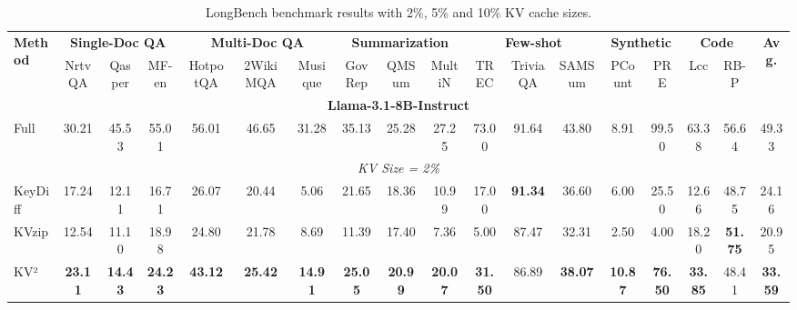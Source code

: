 \documentclass[11pt]{article}
\begin{document}
\pagestyle{empty}

\begin{table}[htbp]
\centering
\caption{LongBench benchmark results with 2\%, 5\% and 10\% KV cache sizes.}
\label{tab:longbench_results}
\small
\setlength{\tabcolsep}{3pt}
\renewcommand{\arraystretch}{1.2}

\begin{tabular}{l|ccc|ccc|ccc|ccc|cc|cc|c}
\toprule
\multirow{2}{*}{\textbf{Method}} 
    & \multicolumn{3}{c|}{\textbf{Single-Doc QA}}
    & \multicolumn{3}{c|}{\textbf{Multi-Doc QA}} 
    & \multicolumn{3}{c|}{\textbf{Summarization}}
    & \multicolumn{3}{c|}{\textbf{Few-shot}}
    & \multicolumn{2}{c|}{\textbf{Synthetic}}
    & \multicolumn{2}{c|}{\textbf{Code}}
    & \multirow{2}{*}{\textbf{Avg.}} \\
\cmidrule(lr){2-4} \cmidrule(lr){5-7} \cmidrule(lr){8-10} \cmidrule(lr){11-13} \cmidrule(lr){14-15} \cmidrule(lr){16-17}
    & NrtvQA & Qasper & MF-en 
    & HotpotQA & 2WikiMQA & Musique 
    & GovRep & QMSum & MultiN
    & TREC & TriviaQA & SAMSum
    & PCount & PRE
    & Lcc & RB-P
    & \\
\midrule

\multicolumn{18}{c}{\textbf{Llama-3.1-8B-Instruct}} \\
\midrule

Full 
    & 30.21 & 45.53 & 55.01
    & 56.01 & 46.65 & 31.28
    & 35.13 & 25.28 & 27.25
    & 73.00 & 91.64 & 43.80
    & 8.91 & 99.50
    & 63.38 & 56.64
    & 49.33 \\

\midrule
\multicolumn{18}{c}{\textit{KV Size = 2\%}} \\
\midrule

KeyDiff 
    & 17.24 & 12.11 & 16.71
    & 26.07 & 20.44 & 5.06
    & 21.65 & 18.36 & 10.99
    & 17.00 & \textbf{91.34} & 36.60
    & 6.00 & 25.50
    & 12.66 & 48.75
    & 24.16 \\

KVzip 
    & 12.54 & 11.10 & 18.98
    & 24.80 & 21.78 & 8.69
    & 11.39 & 17.40 & 7.36
    & 5.00 & 87.47 & 32.31
    & 2.50 & 4.00
    & 18.20 & \textbf{51.75}
    & 20.95 \\

KV²
    & \textbf{23.11} & \textbf{14.43} & \textbf{24.23}
    & \textbf{43.12} & \textbf{25.42} & \textbf{14.91}
    & \textbf{25.05} & \textbf{20.99} & \textbf{20.07}
    & \textbf{31.50} & 86.89 & \textbf{38.07}
    & \textbf{10.87} & \textbf{76.50}
    & \textbf{33.85} & 48.41
    & \textbf{33.59} \\


\end{tabular}
\end{table}
\end{document}
